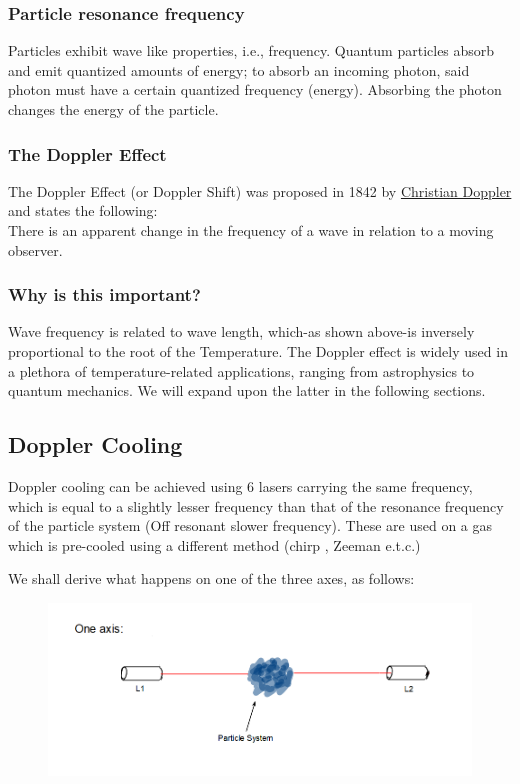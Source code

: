 \documentclass[../main.tex]{subfiles}
\begin{document}
\subsubsection{Particle resonance frequency}
Particles exhibit wave like properties, i.e., frequency. Quantum particles absorb and emit quantized amounts of energy; to absorb an incoming photon, said photon must have a certain quantized frequency (energy). Absorbing the photon changes the energy of the particle.

\subsubsection{The Doppler Effect}

\tab The Doppler Effect (or Doppler Shift) was proposed in 1842 by \href{https://en.wikipedia.org/wiki/Christian_Doppler}{Christian Doppler} and states the following: \\
There is an apparent change in the frequency of a wave in relation to a moving observer. \\

\subsubsection{Why is this important?}

Wave frequency is related to wave length, which-as shown above-is inversely proportional to the root of the Temperature.
The Doppler effect is widely used in a plethora of temperature-related applications, ranging from astrophysics to quantum mechanics. We will expand upon the latter in the following sections.

\subsection{Doppler Cooling}
Doppler cooling can be achieved using 6 lasers carrying the same frequency, which is equal to a slightly lesser frequency than that of the resonance frequency of the particle system (Off resonant slower frequency). These are used on a gas which is pre-cooled using a different method (chirp , Zeeman  e.t.c.)

We shall derive what happens on one of the three axes, as follows:

\begin{figure}[!ht]
    \centering
    \includegraphics[scale = 0.4]{images/bimg.jpeg}
    \caption{}
\end{figure}
\end{document}

